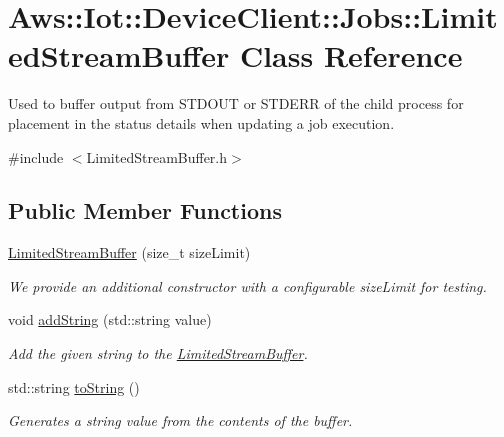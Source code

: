 \hypertarget{class_aws_1_1_iot_1_1_device_client_1_1_jobs_1_1_limited_stream_buffer}{}\section{Aws\+:\+:Iot\+:\+:Device\+Client\+:\+:Jobs\+:\+:Limited\+Stream\+Buffer Class Reference}
\label{class_aws_1_1_iot_1_1_device_client_1_1_jobs_1_1_limited_stream_buffer}


Used to buffer output from S\+T\+D\+O\+UT or S\+T\+D\+E\+RR of the child process for placement in the status details when updating a job execution.  




{\ttfamily \#include $<$Limited\+Stream\+Buffer.\+h$>$}

\subsection*{Public Member Functions}
\begin{DoxyCompactItemize}
\item 
\hyperlink{class_aws_1_1_iot_1_1_device_client_1_1_jobs_1_1_limited_stream_buffer_a3896a40c3e126a15f627b2d5eb3f5a5f}{Limited\+Stream\+Buffer} (size\+\_\+t size\+Limit)
\begin{DoxyCompactList}\small\item\em We provide an additional constructor with a configurable size\+Limit for testing. \end{DoxyCompactList}\item 
void \hyperlink{class_aws_1_1_iot_1_1_device_client_1_1_jobs_1_1_limited_stream_buffer_ab3388037fd612b094635a2fccdd3727e}{add\+String} (std\+::string value)
\begin{DoxyCompactList}\small\item\em Add the given string to the \hyperlink{class_aws_1_1_iot_1_1_device_client_1_1_jobs_1_1_limited_stream_buffer}{Limited\+Stream\+Buffer}. \end{DoxyCompactList}\item 
std\+::string \hyperlink{class_aws_1_1_iot_1_1_device_client_1_1_jobs_1_1_limited_stream_buffer_a99396226499c5aee2bc55c903d23c48e}{to\+String} ()
\begin{DoxyCompactList}\small\item\em Generates a string value from the contents of the buffer. \end{DoxyCompactList}\end{DoxyCompactItemize}
